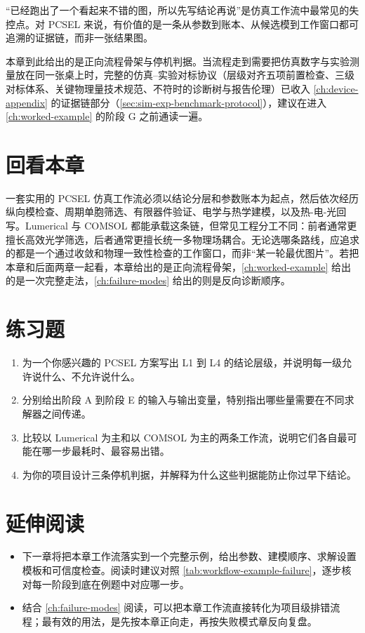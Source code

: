 \begin{PitfallBox}
“已经跑出了一个看起来不错的图，所以先写结论再说”是仿真工作流中最常见的失控点。对 PCSEL 来说，有价值的是一条从参数到账本、从候选模到工作窗口都可追溯的证据链，而非一张结果图。
\end{PitfallBox}
本章到此给出的是正向流程骨架与停机判据。当流程走到需要把仿真数字与实验测量放在同一张桌上时，完整的仿真--实验对标协议（层级对齐五项前置检查、三级对标体系、关键物理量技术规范、不符时的诊断树与报告伦理）已收入 \cref{ch:device-appendix} 的证据链部分（\cref{sec:sim-exp-benchmark-protocol}），建议在进入 \cref{ch:worked-example} 的阶段 G 之前通读一遍。

\section*{回看本章}
一套实用的 PCSEL 仿真工作流必须以结论分层和参数账本为起点，然后依次经历纵向模检查、周期单胞筛选、有限器件验证、电学与热学建模，以及热-电-光回写。Lumerical 与 COMSOL 都能承载这条链，但常见工程分工不同：前者通常更擅长高效光学筛选，后者通常更擅长统一多物理场耦合。无论选哪条路线，应追求的都是一个通过收敛和物理一致性检查的工作窗口，而非“某一轮最优图片”。若把本章和后面两章一起看，本章给出的是正向流程骨架，\cref{ch:worked-example} 给出的是一次完整走法，\cref{ch:failure-modes} 给出的则是反向诊断顺序。

\section*{练习题}
\begin{enumerate}
  \item \basicq 为一个你感兴趣的 PCSEL 方案写出 L1 到 L4 的结论层级，并说明每一级允许说什么、不允许说什么。

  \item \basicq 分别给出阶段 A 到阶段 E 的输入与输出变量，特别指出哪些量需要在不同求解器之间传递。

  \item \midq 比较以 Lumerical 为主和以 COMSOL 为主的两条工作流，说明它们各自最可能在哪一步最耗时、最容易出错。

  \item \hardq 为你的项目设计三条停机判据，并解释为什么这些判据能防止你过早下结论。
\end{enumerate}

\section*{延伸阅读}
\begin{itemize}
  \item 下一章将把本章工作流落实到一个完整示例，给出参数、建模顺序、求解设置模板和可信度检查。阅读时建议对照 \cref{tab:workflow-example-failure}，逐步核对每一阶段到底在例题中对应哪一步。

  \item 结合 \cref{ch:failure-modes} 阅读，可以把本章工作流直接转化为项目级排错流程；最有效的用法，是先按本章正向走，再按失败模式章反向复盘。
\end{itemize}
